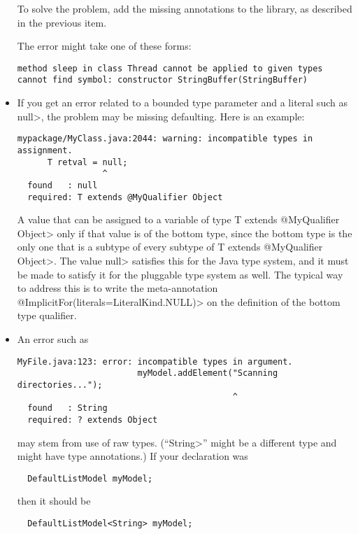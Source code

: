 \begin{itemize}
To solve the problem, add the missing annotations to the library, as
described in the previous item.

The error might take one of these forms:

\begin{Verbatim}
method sleep in class Thread cannot be applied to given types
cannot find symbol: constructor StringBuffer(StringBuffer)
\end{Verbatim}

\item
If you get an error related to a bounded type parameter and a literal such
as \<null>, the problem may be missing defaulting.  Here is an example:

\begin{Verbatim}
mypackage/MyClass.java:2044: warning: incompatible types in assignment.
      T retval = null;
                 ^
  found   : null
  required: T extends @MyQualifier Object
\end{Verbatim}

\noindent
A value that can be assigned to a variable of type \<T extends @MyQualifier
Object> only if that value is of the bottom type, since the bottom type is
the only one that is a subtype of every subtype of \<T extends @MyQualifier
Object>.  The value \<null> satisfies this for the Java type system, and it
must be made to satisfy it for the pluggable type system as well.  The
typical way to address this is to write the meta-annotation
\<@ImplicitFor(literals={LiteralKind.NULL})> on the definition of the
bottom type qualifier.

\item
An error such as

\begin{Verbatim}
MyFile.java:123: error: incompatible types in argument.
                        myModel.addElement("Scanning directories...");
                                           ^
  found   : String
  required: ? extends Object
\end{Verbatim}

\noindent
may stem from use of raw types.  (``\<String>'' might be a different type
and might have type annotations.)  If your declaration was

\begin{Verbatim}
  DefaultListModel myModel;
\end{Verbatim}

\noindent
then it should be
\begin{Verbatim}
  DefaultListModel<String> myModel;
\end{Verbatim}


\end{itemize}
